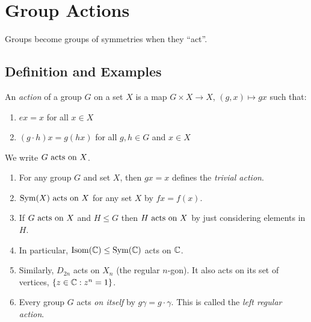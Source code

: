 \documentclass[../main.tex]{subfiles}
\begin{document}
\chapter{Group Actions}
Groups become groups of symmetries when they ``act''.
\section{Definition and Examples}
\begin{definition}
  An \textit{action} of a group $G$ on a set $X$ is a map $G \times X \to X$, $(g, x) \mapsto gx$ such that:
  \label{actionDef}
  \begin{enumerate}
    \item $ex = x$ for all $x \in X$
    \item $(g \cdot h)x = g(hx)$ for all $g, h \in G$ and $x \in X$
  \end{enumerate}
\end{definition}
We write $G \text{ acts on } X$.
\begin{example}
  \label{actionExamples}
  \begin{enumerate}
    \item For any group $G$ and set $X$, then $gx = x$ defines the \textit{trivial action}.
    \item $\operatorname{Sym}(X) \text{ acts on } X$ for any set $X$ by $fx = f(x)$.
    \item If $G \text{ acts on } X$ and $H \leq G$ then $H \text{ acts on } X$ by just considering elements in $H$.
    \item In particular, $\operatorname{Isom}(\mathbb{C}) \leq \operatorname{Sym}(\mathbb{C})$ acts on $\mathbb{C}$.
    \item Similarly, $D_{2n}$ acts on $X_n$ (the regular $n$-gon).
      It also acts on its set of vertices, $\{z \in \mathbb{C} : z^{n} = 1\}$.
    \item Every group $G$ acts \textit{on itself} by $g \gamma = g \cdot \gamma$.
      This is called the \textit{left regular action}.
  \end{enumerate}
\end{example}
\end{document}
